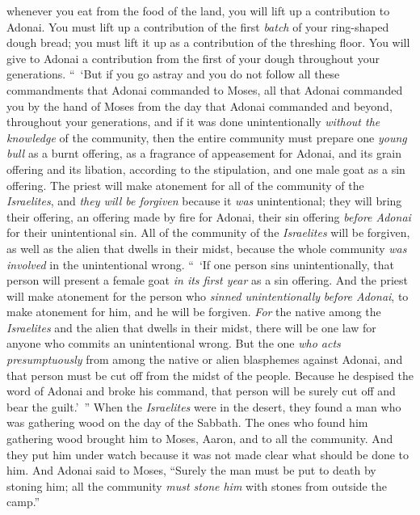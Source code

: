 \begin{biblechapter}
\verse whenever you eat from the food of the land, you will lift up a contribution to Adonai.
\verse You must lift up a contribution of the first \textit{batch} of your ring-shaped dough bread; you must lift it up as a contribution of the threshing floor.
\verse You will give to Adonai a contribution from the first of your dough throughout your generations.
\verse “ ‘But if you go astray and you do not follow all these commandments that Adonai commanded to Moses,
\verse all that Adonai commanded you by the hand of Moses from the day that Adonai commanded and beyond, throughout your generations,
\verse and if it was done unintentionally \textit{without the knowledge} of the community, then the entire community must prepare one \textit{young bull} as a burnt offering, as a fragrance of appeasement for Adonai, and its grain offering and its libation, according to the stipulation, and one male goat as a sin offering.
\verse The priest will make atonement for all of the community of the \textit{Israelites}, and \textit{they will be forgiven} because it \textit{was} unintentional; they will bring their offering, an offering made by fire for Adonai, their sin offering \textit{before Adonai} for their unintentional sin.
\verse All of the community of the \textit{Israelites} will be forgiven, as well as the alien that dwells in their midst, because the whole community \textit{was involved} in the unintentional wrong.
\verse “ ‘If one person sins unintentionally, that person will present a female goat \textit{in its first year} as a sin offering.
\verse And the priest will make atonement for the person who \textit{sinned unintentionally} \textit{before Adonai}, to make atonement for him, and he will be forgiven.
\verse \textit{For} the native among the \textit{Israelites} and the alien that dwells in their midst, there will be one law for anyone who commits an unintentional wrong.
\verse But the one \textit{who acts presumptuously} from among the native or alien blasphemes against Adonai, and that person must be cut off from the midst of the people.
\verse Because he despised the word of Adonai and broke his command, that person will be surely cut off and bear the guilt.’ ”
 When the \textit{Israelites} were in the desert, they found a man who was gathering wood on the day of the Sabbath.
\verse The ones who found him gathering wood brought him to Moses, Aaron, and to all the community.
\verse And they put him under watch because it was not made clear what should be done to him.
\verse And Adonai said to Moses, “Surely the man must be put to death by stoning him; all the community \textit{must stone him} with stones from outside the camp.”

\end{biblechapter}
